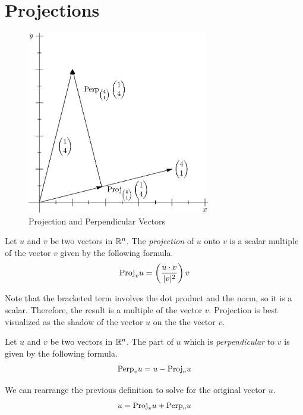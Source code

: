 \documentclass[fleqn]{report}
\begin{document}
\section{Projections}

\begin{figure}[t]
\centering
\includegraphics[width=8cm]{figure9.eps}
\caption{Projection and Perpendicular Vectors}
\label{Projections} 
\end{figure}

\begin{defn}
Let $u$ and $v$ be two vectors in $\mathbb{R}^n$. The
\emph{projection} of
$u$ onto $v$ is a scalar multiple of the vector $v$ given by
the following formula.
\begin{equation*}
\mathrm{Proj}_v u = \left( \frac{u \cdot v}{|v|^2} \right) v
\end{equation*}
\end{defn}

Note that the bracketed term involves the dot product and the norm, so
it is a scalar. Therefore, the result is a multiple of
the vector $v$. Projection is best visualized as the shadow
of the vector $u$ on the the vector $v$.

\begin{defn}
Let $u$ and $v$ be two vectors in $\mathbb{R}^n$. The part of $u$ which
is \emph{perpendicular} to $v$ is given by the following
formula.
\begin{equation*}
\mathrm{Perp}_v u = u - \mathrm{Proj}_v u
\end{equation*}
\end{defn}

We can rearrange the previous definition to solve for the
original vector $u$.
\begin{equation*}
u = \mathrm{Proj}_v u + \mathrm{Perp}_v u
\end{equation*}
\end{document}
